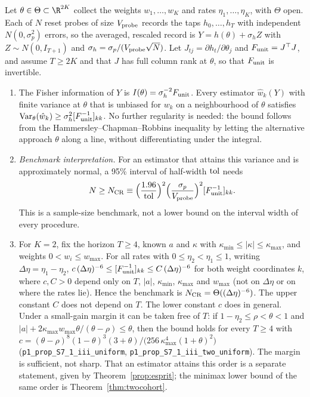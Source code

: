 \begin{proposition}\label{prop:crb}
Let $\theta\in\Theta\subset\R^{2K}$ collect the weights $w_1,\ldots,w_K$ and rates $\eta_1,\ldots,\eta_K$, with $\Theta$ open. Each of $N$ reset probes of size $V_{\rm probe}$ records the taps $h_0,\ldots,h_T$ with independent $N(0,\sigma_p^2)$ errors, so the averaged, rescaled record is $Y=h(\theta)+\sigma_hZ$ with $Z\sim N(0,I_{T+1})$ and $\sigma_h=\sigma_p/(V_{\rm probe}\sqrt N)$. Let $J_{tj}=\partial h_t/\partial\theta_j$ and $F_{\rm unit}=J^\top J$, and assume $T\ge2K$ and that $J$ has full column rank at $\theta$, so that $F_{\rm unit}$ is invertible.
\begin{enumerate}[label=(\roman*)]
\item The Fisher information of $Y$ is $I(\theta)=\sigma_h^{-2}F_{\rm unit}$. Every estimator $\hat w_k(Y)$ with finite variance at $\theta$ that is unbiased for $w_k$ on a neighbourhood of $\theta$ satisfies ${\rm Var}_\theta(\hat w_k)\ge\sigma_h^2[F_{\rm unit}^{-1}]_{kk}$. No further regularity is needed: the bound follows from the Hammersley--Chapman--Robbins inequality by letting the alternative approach $\theta$ along a line, without differentiating under the integral.
\item \emph{Benchmark interpretation.} For an estimator that attains this variance and is approximately normal, a 95\% interval of half-width ${\rm tol}$ needs
\begin{equation}\label{eq:Ncrb}
N\ge N_{\rm CR}\equiv\Bigl(\frac{1.96}{\rm tol}\Bigr)^2\Bigl(\frac{\sigma_p}{V_{\rm probe}}\Bigr)^2[F_{\rm unit}^{-1}]_{kk}.
\end{equation}
This is a sample-size benchmark, not a lower bound on the interval width of every procedure.
\item For $K=2$, fix the horizon $T\ge4$, known $a$ and $\kappa$ with $\kappa_{\min}\le|\kappa|\le\kappa_{\max}$, and weights $0<w_i\le w_{\max}$. For all rates with $0\le\eta_2<\eta_1\le1$, writing $\Delta\eta=\eta_1-\eta_2$, $c\,(\Delta\eta)^{-6}\le[F_{\rm unit}^{-1}]_{kk}\le C\,(\Delta\eta)^{-6}$ for both weight coordinates $k$, where $c,C>0$ depend only on $T$, $|a|$, $\kappa_{\min}$, $\kappa_{\max}$ and $w_{\max}$ (not on $\Delta\eta$ or on where the rates lie). Hence the benchmark is $N_{\rm CR}=\Theta((\Delta\eta)^{-6})$. The upper constant $C$ does not depend on $T$. The lower constant $c$ does in general. Under a small-gain margin it can be taken free of $T$: if $1-\eta_2\le\rho<\theta<1$ and $|a|+2\kappa_{\max}w_{\max}\theta/(\theta-\rho)\le\theta$, then the bound holds for every $T\ge4$ with $c=(\theta-\rho)^8(1-\theta)^3(3+\theta)/\bigl(256\,\kappa_{\max}^4(1+\theta)^2\bigr)$ (\nolinkurl{p1_prop_S7_1_iii_uniform}, \nolinkurl{p1_prop_S7_1_iii_two_uniform}). The margin is sufficient, not sharp. That an estimator attains this order is a separate statement, given by Theorem~\ref{prop:esprit}; the minimax lower bound of the same order is Theorem~\ref{thm:twocohort}.
\end{enumerate}
\end{proposition}

